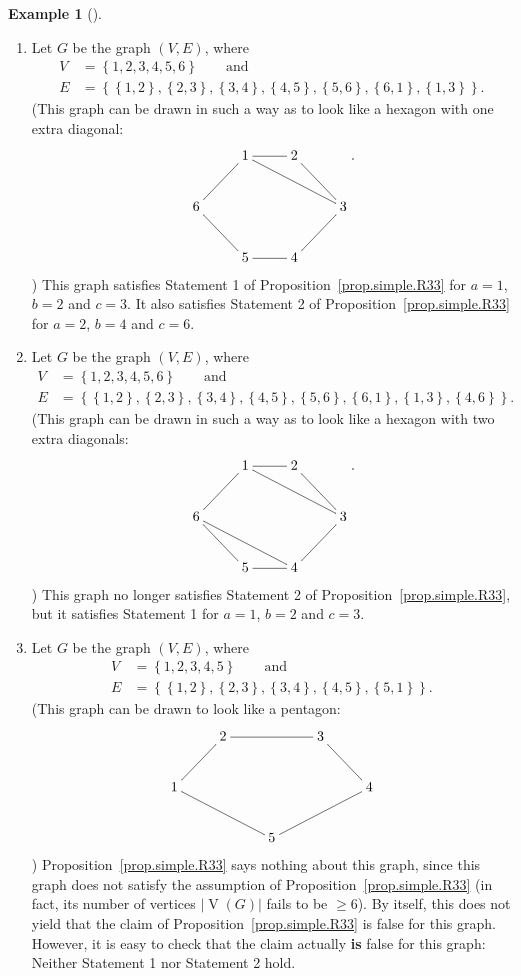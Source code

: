 \documentclass[numbers=enddot,12pt,final,onecolumn,notitlepage]{scrartcl}%
\makeatletter
\theoremstyle{definition}
\newtheorem{exam}[theo]{Example}
\newenvironment{example}[1][]
{\begin{exam}[#1]\begin{leftbar}}
{\end{leftbar}\end{exam}}
\newcommand{\set}[1]{\left\{ #1 \right\}}
\newcommand{\abs}[1]{\left| #1 \right|}
\newcommand{\tup}[1]{\left( #1 \right)}
\newcommand{\verts}[1]{\operatorname{V}\left( #1 \right)}
\newcommand{\are}{\ar@{-}}
\makeatother
\begin{document}
\begin{example}
\begin{enumerate}
\item[\textbf{(c)}] Let $G$ be the graph $\tup{V, E}$, where
\begin{align*}
V &= \set{1, 2, 3, 4, 5, 6} \qquad \text{and} \\
E &= \set{\set{1,2}, \set{2,3}, \set{3,4}, \set{4,5}, \set{5,6},
          \set{6,1}, \set{1,3}} .
\end{align*}
(This graph can be drawn in such a way as to look like a hexagon with
one extra diagonal:
\begin{align*}
\xymatrix{
& 1 \are[r] \are[rrd] & 2 \are[rd] \\
6 \are[ru] & & & 3 \are[ld] \\
& 5 \are[lu] & 4 \are[l]
} .
\end{align*}
)
This graph satisfies Statement 1 of Proposition~\ref{prop.simple.R33}
for $a=1$, $b=2$ and $c=3$. It also satisfies Statement 2 of
Proposition~\ref{prop.simple.R33} for $a=2$, $b=4$ and $c=6$.

\item[\textbf{(d)}] Let $G$ be the graph $\tup{V, E}$, where
\begin{align*}
V &= \set{1, 2, 3, 4, 5, 6} \qquad \text{and} \\
E &= \set{\set{1,2}, \set{2,3}, \set{3,4}, \set{4,5}, \set{5,6},
          \set{6,1}, \set{1,3}, \set{4,6}} .
\end{align*}
(This graph can be drawn in such a way as to look like a hexagon with
two extra diagonals:
\begin{align*}
\xymatrix{
& 1 \are[r] \are[rrd] & 2 \are[rd] \\
6 \are[ru] \are[rrd] & & & 3 \are[ld] \\
& 5 \are[lu] & 4 \are[l]
} .
\end{align*}
)
This graph no longer satisfies Statement 2 of
Proposition~\ref{prop.simple.R33}, but it satisfies Statement 1
for $a=1$, $b=2$ and $c=3$.

\item[\textbf{(e)}] Let $G$ be the graph $\tup{V, E}$, where
\begin{align*}
V &= \set{1, 2, 3, 4, 5} \qquad \text{and} \\
E &= \set{\set{1,2}, \set{2,3}, \set{3,4}, \set{4,5}, \set{5,1}} .
\end{align*}
(This graph can be drawn to look like a pentagon:
\begin{align*}
\xymatrix{
& 2 \are[rr] & & 3 \are[rd] \\
1 \are[ru] \are[rrd] & & & & 4 \are[lld] \\
& & 5
}
\end{align*}
)
Proposition~\ref{prop.simple.R33} says nothing about this graph,
since this graph does not satisfy the assumption of
Proposition~\ref{prop.simple.R33} (in fact, its number of vertices
$\abs{\verts{G}}$ fails to be $\geq 6$).
By itself, this does not yield that the claim of
Proposition~\ref{prop.simple.R33} is false for this graph. However,
it is easy to check that the claim actually \textbf{is} false for this
graph: Neither Statement 1 nor Statement 2 hold.
\end{enumerate}

\end{example}
\end{document}

